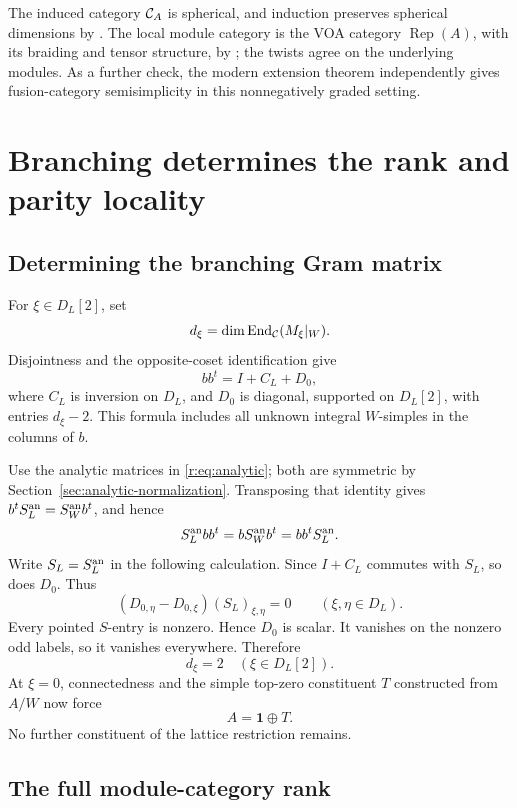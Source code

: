 \documentclass[11pt,a4paper]{article}
\numberwithin{equation}{section}
\theoremstyle{definition}\newtheorem{definition}[theorem]{Definition}
\theoremstyle{remark}\newtheorem{remark}[theorem]{Remark}
\newcommand{\one}{\mathbf1}\newcommand{\B}{\mathcal B}\newcommand{\W}{W_N}
\newcommand{\Rep}{\operatorname{Rep}}\newcommand{\Ext}{\operatorname{Ext}}
\begin{document}
The induced category \(\mathcal C_A\) is spherical, and induction
preserves spherical dimensions by \cite[Theorem 1.18 and
Remark 1.19]{ko}. The local module category is the
VOA category \(\Rep(A)\), with its braiding and tensor structure,
by \cite[Theorem 3.65]{ckm}; the twists agree on the underlying
modules. As a further check, the modern extension theorem
\cite[Theorem 4.10]{cmsy} independently gives fusion-category
semisimplicity in this nonnegatively graded setting.

\section{Branching determines the rank and parity locality}
\label{sec:branching-rank}

\subsection{Determining the branching Gram matrix}

For \(\xi\in D_L[2]\), set
\[
 d_\xi=\dim\operatorname{End}_{\mathcal C}(M_\xi|_W).
\]
Disjointness and the opposite-coset identification give
\begin{equation}\label{r:eq:gram}
 bb^t=I+C_L+D_0,
\end{equation}
where \(C_L\) is inversion on \(D_L\), and \(D_0\) is diagonal,
supported on \(D_L[2]\), with entries \(d_\xi-2\).
This formula includes all unknown integral \(W\)-simples in the
columns of \(b\).

Use the analytic matrices in \eqref{r:eq:analytic}; both are symmetric
by Section~\ref{sec:analytic-normalization}. Transposing that identity
gives $b^tS_L^{\rm an}=S_W^{\rm an}b^t$, and hence
\[
 S_L^{\rm an}bb^t=bS_W^{\rm an}b^t=bb^tS_L^{\rm an}.
\]
Write $S_L=S_L^{\rm an}$ in the following calculation.
Since \(I+C_L\) commutes with \(S_L\), so does \(D_0\).
Thus
\[
 (D_{0,\eta}-D_{0,\xi})(S_L)_{\xi,\eta}=0
                     \qquad(\xi,\eta\in D_L).
\]
Every pointed \(S\)-entry is nonzero. Hence \(D_0\) is scalar.
It vanishes on the nonzero odd labels, so it vanishes everywhere.
Therefore
\[
                         d_\xi=2\quad(\xi\in D_L[2]).
\]
At \(\xi=0\), connectedness and the simple top-zero constituent \(T\)
constructed from \(A/W\) now force
\begin{equation}\label{r:eq:A1T}
                              A=\one\oplus T.
\end{equation}
No further constituent of the lattice restriction remains.

\subsection{The full module-category rank}
\end{document}
